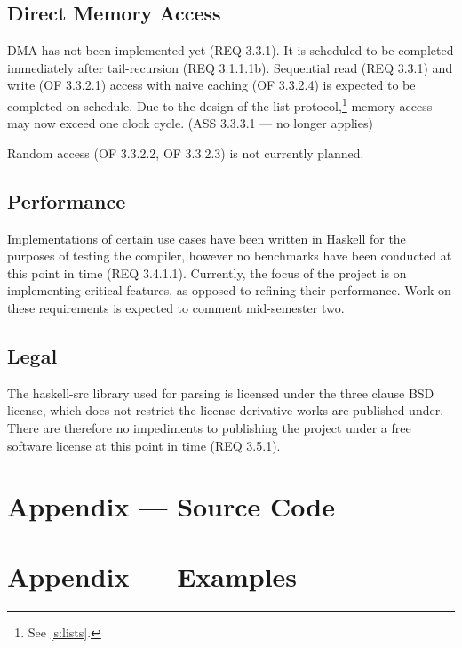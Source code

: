 \documentclass[english,onecolumn]{article}
\begin{document}
\subsection{Direct Memory Access}
DMA has not been implemented yet (REQ 3.3.1). It is scheduled to be completed immediately after tail-recursion (REQ 3.1.1.1b). 
Sequential read (REQ 3.3.1) and write (OF 3.3.2.1) access with naive caching (OF 3.3.2.4) is expected to be completed on schedule. 
Due to the design of the list protocol,\footnote{See \ref{s:lists}.} memory access may now exceed one clock cycle. (ASS 3.3.3.1 --- no longer applies)

Random access (OF 3.3.2.2, OF 3.3.2.3) is not currently planned.

\subsection{Performance}
Implementations of certain use cases have been written in Haskell for the purposes of testing the compiler, however no benchmarks have been conducted at this point in time (REQ 3.4.1.1). Currently, the focus of the project is on implementing critical features, as opposed to refining their performance. Work on these requirements is expected to comment mid-semester two.

\subsection{Legal}
The haskell-src library used for parsing is licensed under the three clause BSD license, which does not restrict the license derivative works are published under. There are therefore no impediments to publishing the project under a free software license at this point in time (REQ 3.5.1).

\appendix
\section{Appendix --- Source Code}

\section{Appendix --- Examples}

\end{document}
